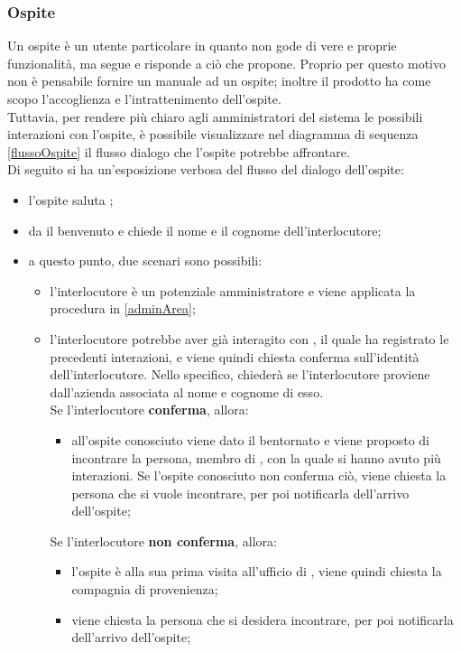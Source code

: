 \subsubsection{Ospite}
Un ospite è un utente particolare in quanto non gode di vere e proprie funzionalità, ma segue e risponde a ciò che \PROGETTO{} propone. Proprio per questo motivo non è pensabile fornire un manuale ad un ospite; inoltre il prodotto ha come scopo l'accoglienza e l'intrattenimento dell'ospite.\\
Tuttavia, per rendere più chiaro agli amministratori del sistema le possibili interazioni con l'ospite, è possibile visualizzare nel diagramma di sequenza \ref{flussoOspite} il flusso dialogo che l'ospite potrebbe affrontare.\\
Di seguito si ha un'esposizione verbosa del flusso del dialogo dell'ospite:
\begin{itemize}
	\item l'ospite saluta \PROGETTO;
	\item \PROGETTO{} da il benvenuto e chiede il nome e il cognome dell'interlocutore;
	\item a questo punto, due scenari sono possibili:
	\begin{itemize}
		\item l'interlocutore è un potenziale amministratore e viene applicata la procedura in \ref{adminArea};
		\item l'interlocutore potrebbe aver già interagito con \PROGETTO, il quale ha registrato le precedenti interazioni, e viene quindi chiesta conferma sull'identità dell'interlocutore. Nello specifico, \PROGETTO{} chiederà se l'interlocutore proviene dall'azienda associata al nome e cognome di esso. \\
		Se l'interlocutore \textbf{conferma}, allora:
		\begin{itemize}
			\item all'ospite conosciuto viene dato il bentornato e viene proposto di incontrare la persona, membro di \PROPONENTE, con la quale si hanno avuto più interazioni. Se l'ospite conosciuto non conferma ciò, viene chiesta la persona che si vuole incontrare, per poi notificarla dell'arrivo dell'ospite;
		\end{itemize}
		Se l'interlocutore \textbf{non conferma}, allora:
		\begin{itemize}
			\item l'ospite è alla sua prima visita all'ufficio di \PROPONENTE, viene quindi chiesta la compagnia di provenienza;
			\item viene chiesta la persona che si desidera incontrare, per poi notificarla dell'arrivo dell'ospite;

\end{itemize}
\end{itemize}
\end{itemize}
